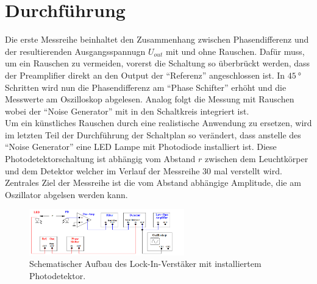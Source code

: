 \section{Durchführung}
Die erste Messreihe beinhaltet den Zusammenhang zwischen Phasendifferenz und der resultierenden Ausgangsspannugn $U_{out}$ mit und ohne Rauschen.
Dafür muss, um ein Rauschen zu vermeiden, vorerst die Schaltung so überbrückt werden, dass der Preamplifier direkt an den Output der 
\enquote{Referenz} angeschlossen ist. In $\SI{45}{\degree}$ Schritten wird nun die Phasendifferenz am \enquote{Phase Schifter} erhöht und die Messwerte am 
Oszilloskop abgelesen. Analog folgt die Messung mit Rauschen wobei der \enquote{Noise Generator} mit in den Schaltkreis integriert ist.
\\
\newline
Um ein künstliches Rauschen durch eine realistische Anwendung zu ersetzen, wird im letzten Teil der Durchführung der Schaltplan so verändert,
dass anstelle des \enquote{Noise Generator} eine LED Lampe mit Photodiode installiert ist. Diese Photodetektorschaltung ist abhängig vom Abstand $r$ zwischen dem Leuchtkörper und dem Detektor
welcher im Verlauf der Messreihe 30 mal verstellt wird. Zentrales Ziel der Messreihe ist die vom Abstand abhängige Amplitude, die am Oszillator abgelsen werden kann.
\begin{figure}
    \centering
    \includegraphics[width=0.6\textwidth]{bilder/licht.png}
    \caption{Schematischer Aufbau des Lock-In-Verstäker mit installiertem Photodetektor. \cite{skript}} 
    \label{fig:licht}
\end{figure}